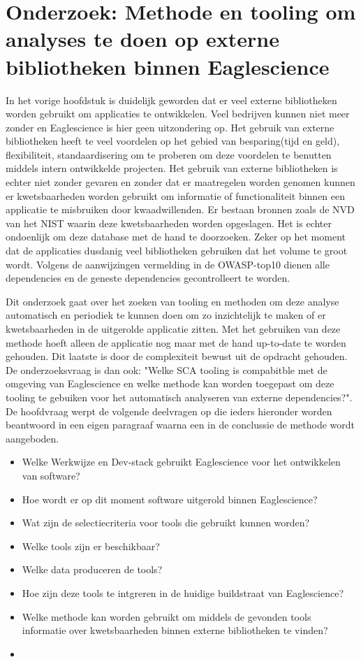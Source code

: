 
\chapter{Onderzoek: Methode en tooling om analyses te doen op externe bibliotheken binnen Eaglescience}\label{ch:onderzoek:-methode-en-tooling-om-analyses-te-doen-op-externe-bibliotheken-binnen-Eaglescience}
In het vorige hoofdstuk is duidelijk geworden dat er veel externe bibliotheken worden gebruikt om applicaties te ontwikkelen. Veel bedrijven kunnen niet meer zonder en Eaglescience is hier geen uitzondering op. Het gebruik van externe bibliotheken heeft te veel voordelen op het gebied van besparing(tijd en geld), flexibiliteit, standaardisering om te proberen om deze voordelen te benutten middels intern ontwikkelde projecten. Het gebruik van externe bibliotheken is echter niet zonder gevaren en zonder dat er maatregelen worden genomen kunnen er kwetsbaarheden worden gebruikt om informatie of functionaliteit binnen een applicatie te misbruiken door kwaadwillenden. Er bestaan bronnen zoals de NVD van het NIST waarin deze kwetsbaarheden worden opgeslagen. Het is echter ondoenlijk om deze database met de hand te doorzoeken. Zeker op het moment dat de applicaties dusdanig veel bibliotheken gebruiken dat het volume te groot wordt. Volgens de aanwijzingen vermelding in de OWASP-top10 dienen alle dependencies en de geneste dependencies gecontrolleert te worden.

Dit onderzoek gaat over het zoeken van tooling en methoden om deze analyse automatisch en periodiek te kunnen doen om zo inzichtelijk te maken of er kwetsbaarheden in de uitgerolde applicatie zitten. Met het gebruiken van deze methode hoeft alleen de applicatie nog maar met de hand up-to-date te worden gehouden. Dit laatste is door de complexiteit bewust uit de opdracht gehouden. De onderzoeksvraag is dan ook: "Welke SCA tooling is compabitble met de omgeving van Eaglescience en welke methode kan worden toegepast om deze tooling te gebuiken voor het automatisch analyseren van externe dependencies?". De hoofdvraag werpt de volgende deelvragen op die ieders hieronder worden beantwoord in een eigen paragraaf waarna een in de conclussie de methode wordt aangeboden.
\begin{itemize}
    \item Welke Werkwijze en Dev-stack gebruikt Eaglescience voor het ontwikkelen van software?
    \item Hoe wordt er op dit moment software uitgerold binnen Eaglescience?
    \item Wat zijn de selectiecriteria voor tools die gebruikt kunnen worden?
    \item Welke tools zijn er beschikbaar?
    \item Welke data produceren de tools?
    \item Hoe zijn deze tools te intgreren in de huidige buildstraat van Eaglescience?
    \item Welke methode kan worden gebruikt om middels de gevonden tools informatie over kwetsbaarheden binnen externe bibliotheken te vinden?
    \item
\end{itemize}

